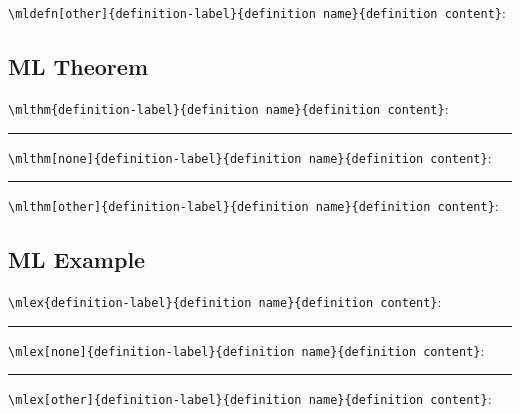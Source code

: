 \documentclass{article}
\begin{document}
\verb|\mldefn[other]{definition-label}{definition name}{definition content}|:

\subsection{ML Theorem}

\verb|\mlthm{definition-label}{definition name}{definition content}|:

\rule{2pt}{\pagewidth}

\verb|\mlthm[none]{definition-label}{definition name}{definition content}|:

\rule{2pt}{\pagewidth}

\verb|\mlthm[other]{definition-label}{definition name}{definition content}|:

\subsection{ML Example}

\verb|\mlex{definition-label}{definition name}{definition content}|:

\rule{2pt}{\pagewidth}

\verb|\mlex[none]{definition-label}{definition name}{definition content}|:

\rule{2pt}{\pagewidth}

\verb|\mlex[other]{definition-label}{definition name}{definition content}|:
\end{document}
